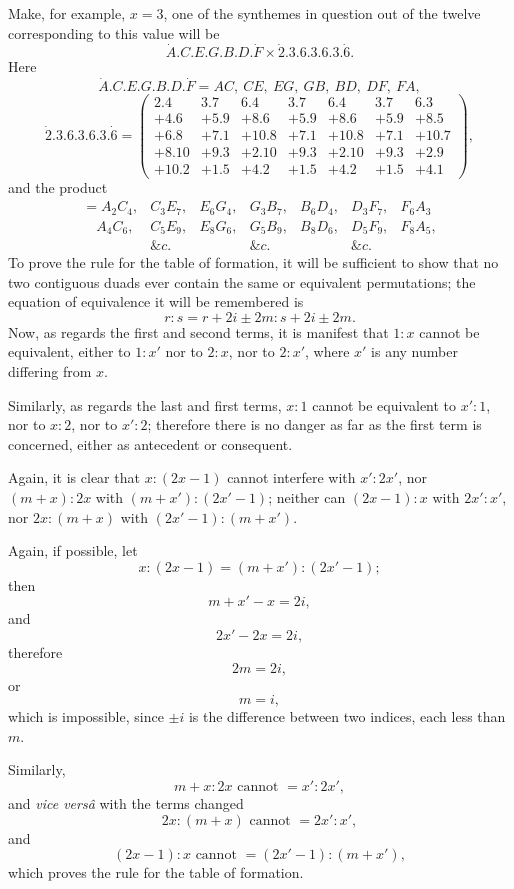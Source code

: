 \documentclass[11pt]{article}
\newcommand{\sourcepage}[1]{\marginpar{\scriptsize p.~#1}}
\newcommand{\dotter}[1]{\dot{#1}}
\begin{document}
\sourcepage{101}
Make, for example, $x=3$, one of the synthemes in question out of the twelve corresponding to this value will be
\[
\dotter A.C.E.G.B.D.\dotter F\times \dotter2.3.6.3.6.3.\dotter6.
\]
Here
\[
\dotter A.C.E.G.B.D.\dotter F = AC,\ CE,\ EG,\ GB,\ BD,\ DF,\ FA,
\]
\[
\dotter2.3.6.3.6.3.\dotter6=
\left(\begin{array}{rrrrrrr}
2.4&3.7&6.4&3.7&6.4&3.7&6.3\\
+4.6&+5.9&+8.6&+5.9&+8.6&+5.9&+8.5\\
+6.8&+7.1&+10.8&+7.1&+10.8&+7.1&+10.7\\
+8.10&+9.3&+2.10&+9.3&+2.10&+9.3&+2.9\\
+10.2&+1.5&+4.2&+1.5&+4.2&+1.5&+4.1
\end{array}\right),
\]
and the product
\[
\begin{array}{lllllll}
= A_2C_4,&C_3E_7,&E_6G_4,&G_3B_7,&B_6D_4,&D_3F_7,&F_6A_3\\
\quad A_4C_6,&C_5E_9,&E_8G_6,&G_5B_9,&B_8D_6,&D_5F_9,&F_8A_5,\\
&\&c.&&\&c.&&\&c.
\end{array}
\]
To prove the rule for the table of formation, it will be sufficient to show that no two contiguous duads ever contain the same or equivalent permutations; the equation of equivalence it will be remembered is
\[
r:s=r+2i\pm2m:s+2i\pm2m.
\]
Now, as regards the first and second terms, it is manifest that $1:x$ cannot be equivalent, either to $1:x'$ nor to $2:x$, nor to $2:x'$, where $x'$ is any number differing from $x$.

Similarly, as regards the last and first terms, $x:1$ cannot be equivalent to $x':1$, nor to $x:2$, nor to $x':2$; therefore there is no danger as far as the first term is concerned, either as antecedent or consequent.

Again, it is clear that $x:(2x-1)$ cannot interfere with $x':2x'$, nor $(m+x):2x$ with $(m+x'):(2x'-1)$; neither can $(2x-1):x$ with $2x':x'$, nor $2x:(m+x)$ with $(2x'-1):(m+x')$.

Again, if possible, let
\[
x:(2x-1)=(m+x'):(2x'-1);
\]
then
\[
m+x'-x=2i,
\]
and
\[
2x'-2x=2i,
\]
therefore
\[
2m=2i,
\]
or
\[
m=i,
\]
which is impossible, since $\pm i$ is the difference between two indices, each less than $m$.

\sourcepage{102}
Similarly,
\[
m+x:2x\text{ cannot }=x':2x',
\]
and \emph{vice vers\^a} with the terms changed
\[
2x:(m+x)\text{ cannot }=2x':x',
\]
and
\[
(2x-1):x\text{ cannot }=(2x'-1):(m+x'),
\]
which proves the rule for the table of formation.
\end{document}
